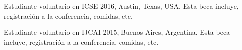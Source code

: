 \item[2016] Estudiante voluntario en ICSE 2016, Austin, Texas, USA. Esta beca incluye,
    registraci\'on a la conferencia, comidas, etc.
    
\item[2015] Estudiante voluntario en IJCAI 2015, Buenos Aires, Argentina. Esta beca incluye,
    registraci\'on a la conferencia, comidas, etc.
